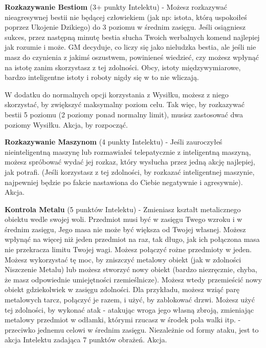 {\textbf{Rozkazywanie Bestiom}\label{sec:Rozkazywanie Bestiom} (3+ punkty Intelektu) - Możesz rozkazywać nieagresywnej bestii nie będącej człowiekiem (jak np: istota, którą uspokoiłeś poprzez Ukojenie Dzikiego) do 3 poziomu w średnim zasięgu. Jeśli osiągniesz sukces, przez następną minutę bestia słucha Twoich werbalnych komend najlepiej jak rozumie i może. GM decyduje, co liczy się jako nieludzka bestia, ale jeśli nie masz do czynienia z jakimś oszustwem, powinieneś wiedzieć, czy możesz wpłynąć na istotę zanim skorzystasz z tej zdolności. Obcy, istoty międzywymiarowe, bardzo inteligentne istoty i roboty nigdy się w to nie wliczają. 

W dodatku do normalnych opcji korzystania z Wysiłku, możesz z niego skorzystać, by zwiększyć maksymalny poziom celu. Tak więc, by rozkazywać bestii 5 poziomu (2 poziomy ponad normalny limit), musisz zastosować dwa poziomy Wysiłku. Akcja, by rozpocząć. 

\textbf{Rozkazywanie Maszynom}\label{sec:Rozkazywanie Maszynom} (4 punkty Intelektu) - Jeśli zauroczyłeś nieinteligentną maszynę lub rozmawiałeś telepatycznie z inteligentną maszyną, możesz spróbować wydać jej rozkaz, który wysłucha przez jedną akcję najlepiej, jak potrafi. (Jeśli korzystasz z tej zdolności, by rozkazać inteligentnej maszynie, najpewniej będzie po fakcie nastawiona do Ciebie negatywnie i agresywnie). Akcja.

\textbf{Kontrola Metalu}\label{sec:Kontrola Metalu}  (5 punktów Intelektu) - Zmieniasz kształt metalicznego obiektu wedle swojej woli. Przedmiot musi być w zasięgu Twego wzroku i w średnim zasięgu, Jego masa nie może być większa od Twojej własnej. Możesz wpłynąć na więcej niż jeden przedmiot na raz, tak długo, jak ich połączona masa nie przekracza limitu Twojej wagi. Możesz połączyć rożne przedmioty w jeden. Możesz wykorzystać tę moc, by zniszczyć metalowy obiekt (jak w zdolności Niszczenie Metalu) lub możesz stworzyć nowy obiekt (bardzo niezręcznie, chyba, że masz odpowiednie umiejętności rzemieślnicze). Możesz wtedy przemieścić nowy obiekt gdziekolwiek w zasięgu zdolności. Dla przykładu, możesz wziąć parę metalowych tarcz, połączyć je razem, i użyć, by zablokować drzwi. Możesz użyć tej zdolności, by wykonać atak - atakując wroga jego własną zbroją, zmieniając metalowy przedmiot w odłamki, którymi rzucasz w środek pola walki itp. - przeciwko jednemu celowi w średnim zasięgu. Niezależnie od formy ataku, jest to akcja Intelektu zadająca 7 punktów obrażeń. Akcja. 

}

